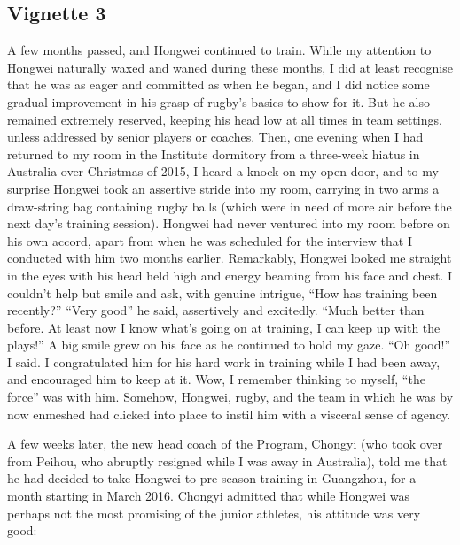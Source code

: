 \subsection{Vignette 3}
A few months passed, and Hongwei continued to train.  While my attention to Hongwei naturally waxed and waned during these months, I did at least recognise that he was as eager and committed as when he began, and I did notice some gradual improvement in his grasp of rugby's basics to show for it.  But he also remained extremely reserved, keeping his head low at all times in team settings, unless addressed by senior players or coaches.  Then, one evening when I had returned to my room in the Institute dormitory from a three-week hiatus in Australia over Christmas of 2015, I heard a knock on my open door, and to my surprise Hongwei took an assertive stride into my room, carrying in two arms a draw-string bag containing rugby balls (which were in need of more air before the next day's training session).  Hongwei had never ventured into my room before on his own accord, apart from when he was scheduled for the interview that I conducted with him two months earlier.  Remarkably, Hongwei looked me straight in the eyes with his head held high and energy beaming from his face and chest.  I couldn't help but smile and ask, with genuine intrigue, ``How has training been recently?''
``Very good'' he said, assertively and excitedly.  ``Much better than before.  At least now I know what’s going on at training, I can keep up with the plays!''  A big smile grew on his face as he continued to hold my gaze.  ``Oh good!'' I said. I congratulated him for his hard work in training while I had been away, and encouraged him to keep at it. Wow, I remember thinking to myself, ``the force'' was with him.  Somehow, Hongwei, rugby, and the team in which he was by now enmeshed had clicked into place to instil him with a visceral sense of agency.

A few weeks later, the new head coach of the Program, Chongyi (who took over from Peihou, who abruptly resigned while I was away in Australia), told me that he had decided to take Hongwei to pre-season training in Guangzhou, for a month starting in March 2016.  Chongyi admitted that while Hongwei was perhaps not the most promising of the junior athletes, his attitude was very good:

